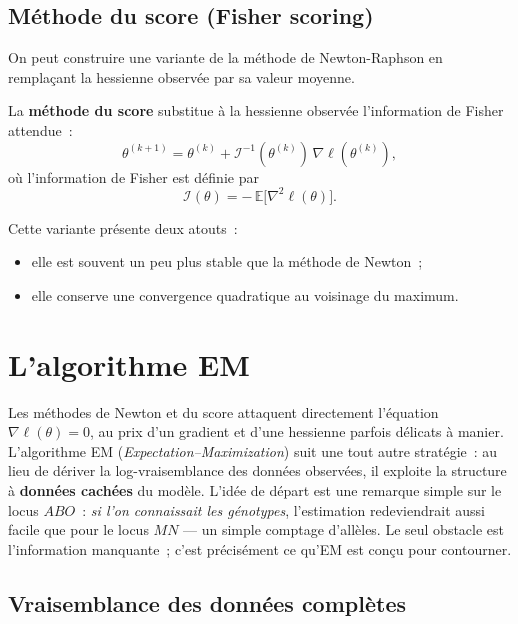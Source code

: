 \subsection{Méthode du score (Fisher scoring)}

On peut construire une variante de la méthode de Newton-Raphson en remplaçant la
hessienne observée par sa valeur moyenne.

\medskip

\begin{mdframed}
\begin{definition}
La \textbf{méthode du score} substitue à la hessienne observée l'information de
Fisher attendue~:
$$
\theta^{(k+1)} = \theta^{(k)}
  + \mathcal{I}^{-1}(\theta^{(k)})\, \nabla \ell(\theta^{(k)}),
$$
où l'information de Fisher est définie par
$$
\mathcal{I}(\theta) = -\,\mathbb{E}\big[\nabla^2 \ell(\theta)\big].
$$
\end{definition}
\end{mdframed}

Cette variante présente deux atouts~:
\begin{itemize}
  \item elle est souvent un peu plus stable que la méthode de Newton~;
  \item elle conserve une convergence quadratique au voisinage du maximum.
\end{itemize}

\section{L'algorithme EM}

Les méthodes de Newton et du score attaquent directement l'équation
$\nabla \ell(\theta) = 0$, au prix d'un gradient et d'une hessienne parfois
délicats à manier. L'algorithme EM (\textit{Expectation--Maximization}) suit une
tout autre stratégie~: au lieu de dériver la log-vraisemblance des données
observées, il exploite la structure à \textbf{données cachées} du modèle. L'idée
de départ est une remarque simple sur le locus $ABO$~: \textit{si l'on
connaissait les génotypes}, l'estimation redeviendrait aussi facile que pour le
locus $MN$ — un simple comptage d'allèles. Le seul obstacle est l'information
manquante~; c'est précisément ce qu'EM est conçu pour contourner.

\subsection{Vraisemblance des données complètes}


